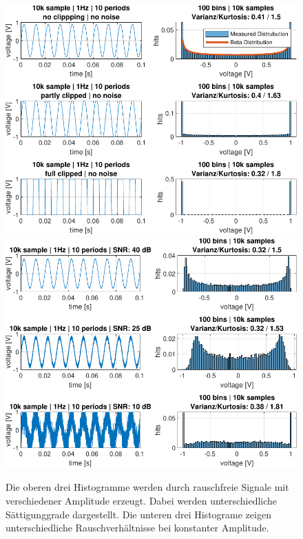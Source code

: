 \begin{figure}[h!] 
	\centering 
	\includegraphics[width=.9\textwidth]{../img/beta-distribution.pdf}
	\includegraphics[width=.9\textwidth]{../img/noise-histogramm.pdf}
	\caption{Die oberen drei Histogramme werden durch rauschfreie Signale mit verschiedener Amplitude erzeugt. Dabei werden unterschiedliche Sättigunggrade dargestellt. Die unteren drei Histograme zeigen unterschiedliche Rauschverhältnisse bei konstanter Amplitude.}
	\label{fig:Histogramm-Gain}
\end{figure} 
